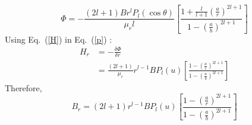 \begin{equation}\label{p}
\Phi=-\frac{(2l+1)Br^lP_l(\cos\theta)}{\mu_r l}\left[\frac{1+\frac{l}{l+1}\left(\frac{a}{r}\right)^{2l+1}}{1-\left(\frac{a}{b}\right)^{2l+1}}\right]
\end{equation}
Using Eq.~(\ref{H}) in Eq.~(\ref{p}) :
\begin{equation}\label{Hr}
\begin{split}
    H_r &=-\frac{\delta \Phi}{\delta r}\\
      &=\frac{(2l+1)}{\mu_r}r^{l-1}BP_l(u)\left[\frac{1-\left(\frac{a}{r}\right)^{2l+1}}{1-\left(\frac{a}{b}\right)^{2l+1}}\right]
\end{split}
\end{equation}
Therefore,
\begin{equation}\label{Br}
B_r=(2l+1)r^{l-1}BP_l(u)\left[\frac{1-\left(\frac{a}{r}\right)^{2l+1}}{1-\left(\frac{a}{b}\right)^{2l+1}}\right]
\end{equation}

